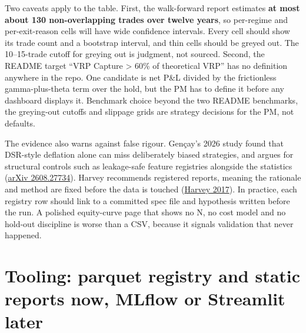 \documentclass{article}
\begin{document}
Two caveats apply to the table. First, the walk-forward report estimates \textbf{at most about 130 non-overlapping trades over twelve years}, so per-regime and per-exit-reason cells will have wide confidence intervals. Every cell should show its trade count and a bootstrap interval, and thin cells should be greyed out. The 10--15-trade cutoff for greying out is judgment, not sourced. Second, the README target ``VRP Capture > 60\% of theoretical VRP'' has no definition anywhere in the repo. One candidate is net P\&L divided by the frictionless gamma-plus-theta term over the hold, but the PM has to define it before any dashboard displays it. Benchmark choice beyond the two README benchmarks, the greying-out cutoffs and slippage grids are strategy decisions for the PM, not defaults.

The evidence also warns against false rigour. Gençay's 2026 study found that DSR-style deflation alone can miss deliberately biased strategies, and argues for structural controls such as leakage-safe feature registries alongside the statistics (\href{https://arxiv.org/abs/2608.27734}{arXiv 2608.27734}). Harvey recommends registered reports, meaning the rationale and method are fixed before the data is touched (\href{https://people.duke.edu/~charvey/Research/Published_Papers/P131_The_scientific_outlook.pdf}{Harvey 2017}). In practice, each registry row should link to a committed spec file and hypothesis written before the run. A polished equity-curve page that shows no N, no cost model and no hold-out discipline is worse than a CSV, because it signals validation that never happened.

\section{Tooling: parquet registry and static reports now, MLflow or Streamlit later}
\end{document}
